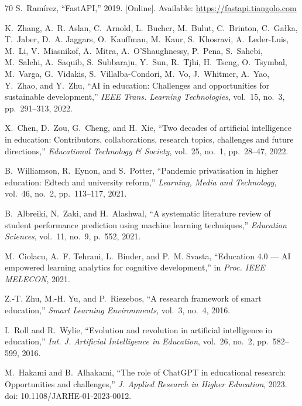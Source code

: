 \begin{thebibliography}{70}
S.~Ram{\'i}rez,
``FastAPI,'' 2019.
[Online]. Available: \url{https://fastapi.tiangolo.com}

K.~Zhang, A.~R. Aslan, C.~Arnold, L.~Bucher, M.~Bulut, C.~Brinton, C.~Ga{\l}ka, T.~Jaber, D.~A. Jaggars, O.~Kauffman, M.~Kaur, S.~Khosravi, A.~Leder-Luis, M.~Li, V.~Miasnikof, A.~Mitra, A.~O'Shaughnessy, P.~Pena, S.~Sahebi, M.~Salehi, A.~Saquib, S.~Subbaraju, Y.~Sun, R.~Tjhi, H.~Tseng, O.~Tsymbal, M.~Varga, G.~Vidakis, S.~Villalba-Condori, M.~Vo, J.~Whitmer, A.~Yao, Y.~Zhao, and Y.~Zhu,
``AI in education: Challenges and opportunities for sustainable development,''
\textit{IEEE Trans. Learning Technologies}, vol.~15, no.~3, pp.~291--313, 2022.

X.~Chen, D.~Zou, G.~Cheng, and H.~Xie,
``Two decades of artificial intelligence in education: Contributors, collaborations, research topics, challenges and future directions,''
\textit{Educational Technology \& Society}, vol.~25, no.~1, pp.~28--47, 2022.

B.~Williamson, R.~Eynon, and S.~Potter,
``Pandemic privatisation in higher education: Edtech and university reform,''
\textit{Learning, Media and Technology}, vol.~46, no.~2, pp.~113--117, 2021.

B.~Albreiki, N.~Zaki, and H.~Alashwal,
``A systematic literature review of student performance prediction using machine learning techniques,''
\textit{Education Sciences}, vol.~11, no.~9, p.~552, 2021.

M.~Ciolacu, A.~F. Tehrani, L.~Binder, and P.~M. Svasta,
``Education 4.0 — AI empowered learning analytics for cognitive development,''
in \textit{Proc. IEEE MELECON}, 2021.

Z.-T. Zhu, M.-H. Yu, and P.~Riezebos,
``A research framework of smart education,''
\textit{Smart Learning Environments}, vol.~3, no.~4, 2016.

I.~Roll and R.~Wylie,
``Evolution and revolution in artificial intelligence in education,''
\textit{Int. J. Artificial Intelligence in Education}, vol.~26, no.~2, pp.~582--599, 2016.

M.~Hakami and B.~Alhakami,
``The role of ChatGPT in educational research: Opportunities and challenges,''
\textit{J. Applied Research in Higher Education}, 2023.
doi: 10.1108/JARHE-01-2023-0012.


\end{thebibliography}
